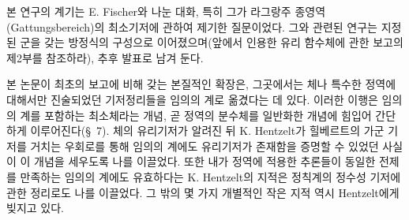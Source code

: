 
본 연구의 계기는 E. Fischer와 나눈 대화, 특히 그가 라그랑주 종영역(Gattungsbereich)의 최소기저에 관하여 제기한 질문이었다. 그와 관련된 연구는 지정된 군을 갖는 방정식의 구성으로 이어졌으며(앞에서 인용한 \glqq{}유리 함수체\grqq{}에 관한 보고의 제2부를 참조하라), 추후 발표로 남겨 둔다.

본 논문이 최초의 보고에 비해 갖는 본질적인 확장은, 그곳에서는 체나 특수한 정역에 대해서만 진술되었던 기저정리들을 임의의 계로 옮겼다는 데 있다. 이러한 이행은 임의의 계를 포함하는 최소체라는 개념, 곧 정역의 분수체를 일반화한 개념에 힘입어 간단하게 이루어진다(\S\ 7). 체의 유리기저가 알려진 뒤 K. Hentzelt가 힐베르트의 가군 기저를 거치는 우회로를 통해 임의의 계에도 유리기저가 존재함을 증명할 수 있었던 사실이 이 개념을 세우도록 나를 이끌었다. 또한 내가 정역에 적용한 추론들이 동일한 전제를 만족하는 임의의 계에도 유효하다는 K. Hentzelt의 지적은 정칙계의 정수성 기저에 관한 정리로도 나를 이끌었다. 그 밖의 몇 가지 개별적인 작은 지적 역시 Hentzelt에게 빚지고 있다.
